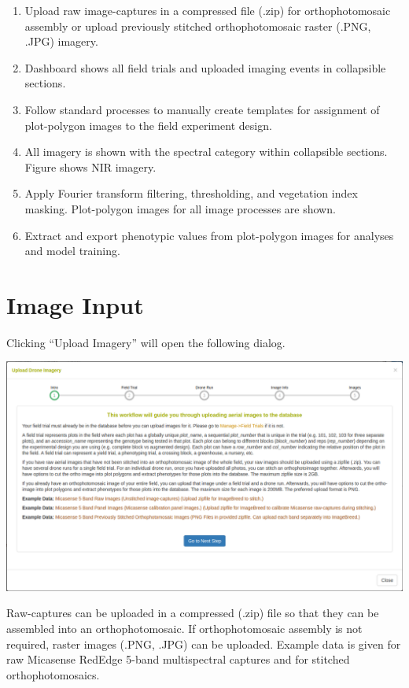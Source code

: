 \documentclass[
  12pt,
]{book}
\providecommand{\tightlist}{%
  \setlength{\itemsep}{0pt}\setlength{\parskip}{0pt}}
\begin{document}
\begin{enumerate}
\def\labelenumi{\arabic{enumi}.}
\tightlist
\item
  Upload raw image-captures in a compressed file (.zip) for orthophotomosaic assembly or upload previously stitched orthophotomosaic raster (.PNG, .JPG) imagery.
\item
  Dashboard shows all field trials and uploaded imaging events in collapsible sections.
\item
  Follow standard processes to manually create templates for assignment of plot-polygon images to the field experiment design.
\item
  All imagery is shown with the spectral category within collapsible sections. Figure shows NIR imagery.
\item
  Apply Fourier transform filtering, thresholding, and vegetation index masking. Plot-polygon images for all image processes are shown.
\item
  Extract and export phenotypic values from plot-polygon images for analyses and model training.
\end{enumerate}

\hypertarget{image-input}{%
\section{Image Input}\label{image-input}}

Clicking ``Upload Imagery'' will open the following dialog.

\begin{center}\includegraphics[width=0.95\linewidth]{assets/images/manage_image_phenotyping_upload_intro} \end{center}

Raw-captures can be uploaded in a compressed (.zip) file so that they can be assembled into an orthophotomosaic. If orthophotomosaic assembly is not required, raster images (.PNG, .JPG) can be uploaded. Example data is given for raw Micasense RedEdge 5-band multispectral captures and for stitched orthophotomosaics.
\end{document}
